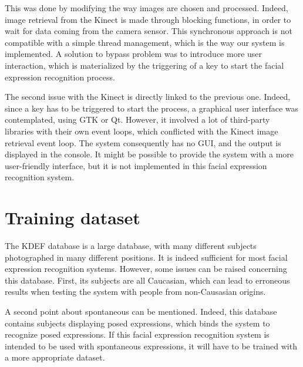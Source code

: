 \noindent This was done by modifying the way images are chosen and processed. Indeed, image retrieval from the Kinect is made through blocking functions, in order to wait for data coming from the camera sensor. This synchronous approach is not compatible with a simple thread management, which is the way our system is implemented. A solution to bypass problem was to introduce more user interaction, which is materialized by the triggering of a key to start the facial expression recognition process.
 \newline 

\noindent The second issue with the Kinect is directly linked to the previous one. Indeed, since a key has to be triggered to start the process, a graphical user interface was contemplated, using GTK or Qt. However, it involved a lot of third-party libraries with their own event loops, which conflicted with the Kinect image retrieval event loop. The system consequently has no GUI, and the output is displayed in the console. It might be possible to provide the system with a more user-friendly interface, but it is not implemented in this facial expression recognition system. 
\newline

\section{Training dataset}

\vspace{\baselineskip}

\noindent The KDEF database is a large database, with many different subjects photographed in many different positions. It is indeed sufficient for most facial expression recognition systems. However, some issues can be raised concerning this database. First, its subjects are all Caucasian, which can lead to erroneous results when testing the system with people from non-Causasian origins.
\newline

\noindent A second point about spontaneous can be mentioned. Indeed, this database contains subjects displaying posed expressions, which binds the system to recognize posed expressions. If this facial expression recognition system is intended to be used with spontaneous expressions, it will have to be trained with a more appropriate dataset.
\newline
